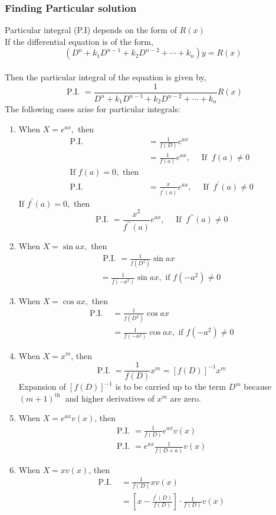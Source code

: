 \subsubsection{Finding Particular solution}
Particular integral (P.I) depends on the form of $R(x)$\\
If the differential equation is of the form,$$\left(D^{n}+k_{1} D^{n-1}+k_{2} D^{n-2}+\cdots+k_{n}\right) y=R(x)$$
\\Then the particular integral of the equation is given by,
$$
\text { P.I. }=\frac{1}{D^{n}+k_{1} D^{n-1}+k_{2} D^{n-2}+\cdots+k_{n}} R(x)
$$
The following cases arise for particular integrals:
\begin{enumerate}
	\item When $X=e^{a x},$ then
	$$
	\begin{aligned}
	\text { P.I. } &=\frac{1}{f(D)} e^{a x} \\
	&=\frac{1}{f(a)} e^{a x},\quad \text { If }\ f(a) \neq 0 \\
	\text { If } f(a)=0, \text { then } \\
	\text { P.I. } &=\frac{x}{f^{\prime}(a)} e^{a x}, \quad \text { If }\ f^{\prime}(a) \neq 0
	\end{aligned}
	$$
	If $f^{\prime}(a)=0,$ then
	$$
	\text { P.I. }=\frac{x^{2}}{f^{\prime \prime}(a)} e^{a x}, \quad \text { If }\ f^{\prime \prime}(a) \neq 0
	$$
	\item  When $X=\sin a x,$ then
	$$
	\begin{array}{c}
	\text { P.I. }=\frac{1}{f\left(D^{2}\right)} \sin a x \\
	=\frac{1}{f\left(-a^{2}\right)} \sin a x, \text { if } f\left(-a^{2}\right) \neq 0
	\end{array}
	$$
	\item When $X=\cos a x,$ then
	$$
	\begin{aligned}
	\text { P.I. } &=\frac{1}{f\left(D^{2}\right)} \cos a x \\
	&=\frac{1}{f\left(-a^{2}\right)} \cos a x, \text { if } f\left(-a^{2}\right) \neq 0
	\end{aligned}
	$$
	\item  When $X=x^{m}$, then
	$$
	\text { P.I. }=\frac{1}{f(D)} x^{m}=[f(D)]^{-1} x^{m}
	$$
	Expansion of $[f(D)]^{-1}$ is to be carried up to the term $D^{m}$ because $(m+1)^{\text {th }}$ and higher derivatives of $x^{m}$ are zero.
	\item When $X=e^{a x} v(x)$, then
	$$
	\begin{array}{l}
	\text { P.I. }=\frac{1}{f(D)} e^{a x} v(x) \\
	\text { P.I. }=e^{a x} \frac{1}{f(D+a)} v(x)
	\end{array}
	$$
	\item When $X=x v(x)$, then
	\begin{align*}
	\text { P.I. }&=\frac{1}{f(D)} x v(x)\\&=\left[x-\frac{f^{\prime}(D)}{f(D)}\right] \cdot \frac{1}{f(D)} v(x)
	\end{align*}
\end{enumerate}
